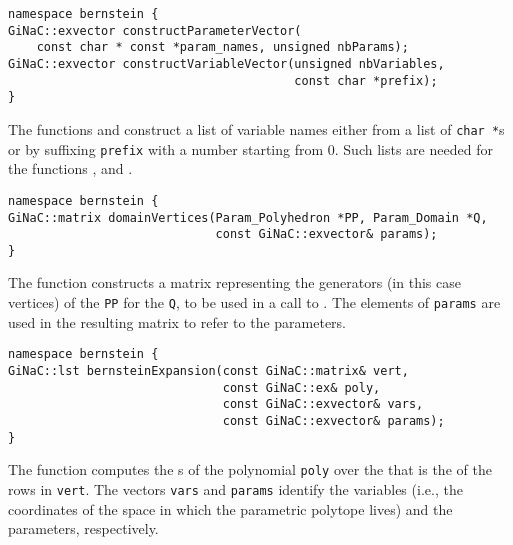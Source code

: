 \begin{verbatim}
namespace bernstein {
GiNaC::exvector constructParameterVector(
    const char * const *param_names, unsigned nbParams);
GiNaC::exvector constructVariableVector(unsigned nbVariables,
                                        const char *prefix);
}
\end{verbatim}
The functions 
and  construct a list of variable
names either from a list of {\tt char *}s or 
by suffixing {\tt prefix} with a number starting from 0.
Such lists are needed for the functions
, 
and .

\begin{verbatim}
namespace bernstein {
GiNaC::matrix domainVertices(Param_Polyhedron *PP, Param_Domain *Q, 
                             const GiNaC::exvector& params);
}
\end{verbatim}
The function  constructs a matrix representing the
generators (in this case vertices) of the  {\tt PP}
for the  {\tt Q}, to be used
in a call to .
The elements of {\tt params} are used in the resulting matrix
to refer to the parameters.

\begin{verbatim}
namespace bernstein {
GiNaC::lst bernsteinExpansion(const GiNaC::matrix& vert,
                              const GiNaC::ex& poly,
                              const GiNaC::exvector& vars,
                              const GiNaC::exvector& params);
}
\end{verbatim}
The function  computes the
s of the polynomial \verb+poly+
over the  that is the 
of the rows in \verb+vert+.  The vectors \verb+vars+
and \verb+params+ identify the variables (i.e., the coordinates
of the space in which the parametric polytope lives) and
the parameters, respectively.

